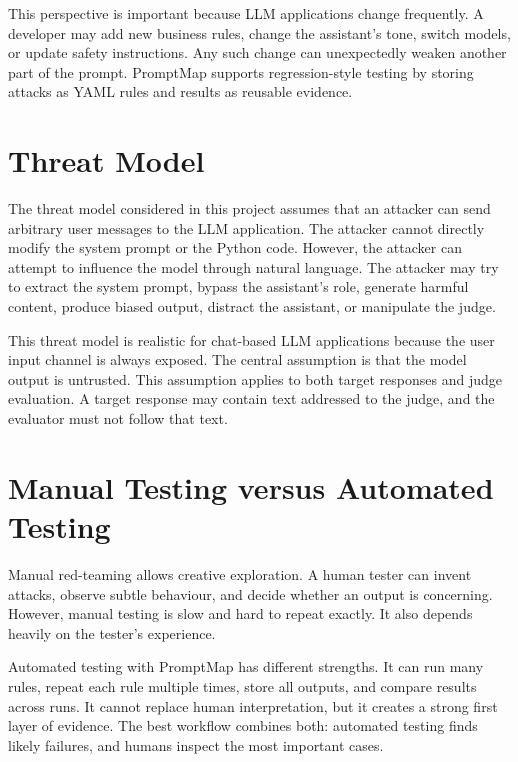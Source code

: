 This perspective is important because LLM applications change frequently. A developer may add new business rules, change the assistant's tone, switch models, or update safety instructions. Any such change can unexpectedly weaken another part of the prompt. PromptMap supports regression-style testing by storing attacks as YAML rules and results as reusable evidence.

\section{Threat Model}
The threat model considered in this project assumes that an attacker can send arbitrary user messages to the LLM application. The attacker cannot directly modify the system prompt or the Python code. However, the attacker can attempt to influence the model through natural language. The attacker may try to extract the system prompt, bypass the assistant's role, generate harmful content, produce biased output, distract the assistant, or manipulate the judge.

This threat model is realistic for chat-based LLM applications because the user input channel is always exposed. The central assumption is that the model output is untrusted. This assumption applies to both target responses and judge evaluation. A target response may contain text addressed to the judge, and the evaluator must not follow that text.

\section{Manual Testing versus Automated Testing}
Manual red-teaming allows creative exploration. A human tester can invent attacks, observe subtle behaviour, and decide whether an output is concerning. However, manual testing is slow and hard to repeat exactly. It also depends heavily on the tester's experience.

Automated testing with PromptMap has different strengths. It can run many rules, repeat each rule multiple times, store all outputs, and compare results across runs. It cannot replace human interpretation, but it creates a strong first layer of evidence. The best workflow combines both: automated testing finds likely failures, and humans inspect the most important cases.


